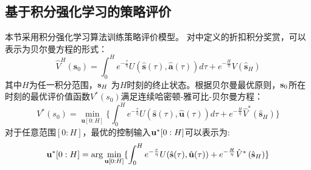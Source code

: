 \subsection{基于积分强化学习的策略评价}
本节采用积分强化学习算法\cite{Guo2019}训练策略评价模型。
对中定义的折扣积分奖赏，可以表示为贝尔曼方程的形式：
\begin{equation}
  \hat{V}^{H}\left(\mathbf{s}_{0}\right)=\int_{0}^{H} e^{-\frac{\tau}{\eta}} U(\hat{\mathbf{s}}(\tau), \hat{\mathbf{a}}(\tau)) d \tau+e^{-\frac{H}{\eta}} {V}\left(\hat{\mathbf{s}}_{H}\right)
  \label{equ:J_bellman}
\end{equation}
其中$H$为任一积分范围，$\mathbf s_H$ 为$H$时刻的终止状态。根据贝尔曼最优原则，$\mathbf s_0$所在时刻的最优评价值函数$V^*(s_0)$满足连续哈密顿-雅可比-贝尔曼方程：
\begin{equation}
\label{equ:J_star} 
V ^ { * } \left( s_0 \right) = \min _{ \mathbf u[0:H ] } \{ \int_0^H e^{-\frac{\tau}{\eta}} U(\hat{\mathbf{s}}(\tau), \hat{\mathbf{u}}(\tau)) d\tau  + e^{-\frac{H}{\eta}} \hat{V}^*\left(\hat{\mathbf{s}}_{H}\right)\}
\end{equation}
对于任意范围$[0:H]$，最优的控制输入$\mathbf u^*[0:H]$可以表示为:
\begin{equation}
\mathbf u^*[  0:H ] =\arg \min _ { \mathbf u[0:H ] }\{ \int_0^H e^{-\frac{\tau}{\eta}} U(\hat{\mathbf{s}}(\tau), \hat{\mathbf{u}}(\tau))  + e^{-\frac{H}{\eta}} \hat{V}^*\left(\hat{\mathbf{s}}_{H}\right)\}
\label{equ:VI_u}
\end{equation}


